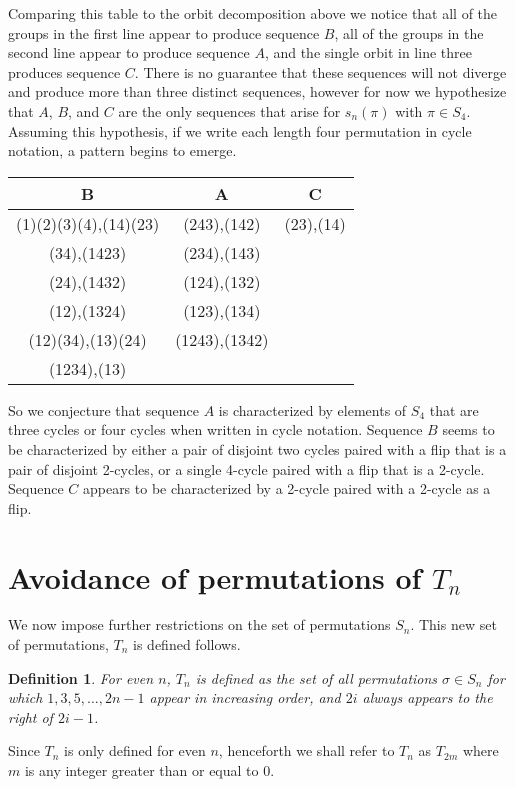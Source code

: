 \documentclass[11pt,letterpaper,twoside,english]{article}
\theoremstyle{theorem}
\newtheorem{definition}[theorem]{Definition}
\theoremstyle{remark}
\begin{document}
Comparing this table to the orbit decomposition above we notice that all of the groups in the first line appear to produce sequence $B$, all of the groups in the second line appear to produce sequence $A$, and the single orbit in line three produces sequence $C$. There is no guarantee that these sequences will not diverge and produce more than three distinct sequences, however for now we hypothesize that $A$, $B$, and $C$ are the only sequences that arise for $s_n(\pi)$ with $\pi\in S_4$. Assuming this hypothesis, if we write each length four permutation in cycle notation, a pattern begins to emerge. 

\begin{center}
\begin{tabular}{|c|c|c|}
B &A&C\\
\hline
(1)(2)(3)(4),(14)(23)&(243),(142)&(23),(14)\\
(34),(1423)&(234),(143)&\\
(24),(1432)&(124),(132)&\\
(12),(1324)&(123),(134)&\\
(12)(34),(13)(24)&(1243),(1342)&\\
(1234),(13)&&\\
\end{tabular}
\end{center}

So we conjecture that sequence $A$ is characterized by elements of $S_4$ that are three cycles or four cycles when written in cycle notation. Sequence $B$ seems to be characterized by either a pair of disjoint two cycles paired with a flip that is a pair of disjoint 2-cycles, or a single 4-cycle paired with a flip that is a 2-cycle. Sequence $C$ appears to be characterized by a 2-cycle paired with a 2-cycle as a flip. 


\section{Avoidance of permutations of $T_n$}
\label{Tn}
We now impose further restrictions on the set of permutations $S_n$. This new set of permutations, $T_n$ is defined follows.

\begin{definition}
For even $n$, $T_n$ is defined as the set of all permutations $\sigma \in S_n$ for which $1,3,5,\ldots,2n-1$ appear in increasing order, and $2i$ always appears to the right of $2i-1$.
\end{definition}

Since $T_n$ is only defined for even $n$, henceforth we shall refer to $T_n$ as $T_{2m}$ where $m$ is any integer greater than or equal to $0$.
\end{document}
